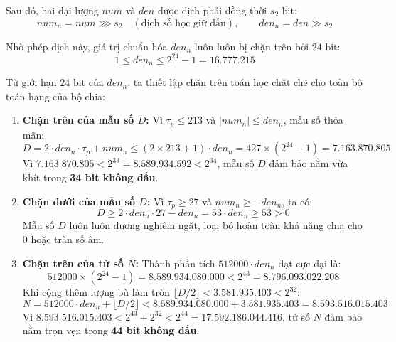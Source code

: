 Sau đó, hai đại lượng $num$ và $den$ được dịch phải đồng thời $s_2$ bit:
\begin{equation}
num_n = num \ggg s_2 \quad (\text{dịch số học giữ dấu}), \qquad den_n = den \gg s_2
\end{equation}

Nhờ phép dịch này, giá trị chuẩn hóa $den_n$ luôn luôn bị chặn trên bởi $24\text{ bit}$:
\begin{equation}
1 \le den_n \le 2^{24} - 1 = \mathbf{16.777.215}
\end{equation}

Từ giới hạn $24\text{ bit}$ của $den_n$, ta thiết lập chặn trên toán học chặt chẽ cho toàn bộ toán hạng của bộ chia:
\begin{enumerate}[leftmargin=1.5em, itemsep=2pt]
    \item \textbf{Chặn trên của mẫu số $D$:}
    Vì $\tau_p \le 213$ và $|num_n| \le den_n$, mẫu số thỏa mãn:
    \begin{equation}
    D = 2 \cdot den_n \cdot \tau_p + num_n \le (2 \times 213 + 1) \cdot den_n = 427 \times (2^{24} - 1) = \mathbf{7.163.870.805}
    \end{equation}
    Vì $7.163.870.805 < 2^{33} = 8.589.934.592 < 2^{34}$, mẫu số $D$ đảm bảo nằm vừa khít trong \textbf{34 bit không dấu}.
    \item \textbf{Chặn dưới của mẫu số $D$:}
    Vì $\tau_p \ge 27$ và $num_n \ge -den_n$, ta có:
    \begin{equation}
    D \ge 2 \cdot den_n \cdot 27 - den_n = 53 \cdot den_n \ge 53 > 0
    \end{equation}
    Mẫu số $D$ luôn luôn dương nghiêm ngặt, loại bỏ hoàn toàn khả năng chia cho 0 hoặc tràn số âm.
    \item \textbf{Chặn trên của tử số $N$:}
    Thành phần tích $512000 \cdot den_n$ đạt cực đại là:
    \begin{equation}
    512000 \times (2^{24} - 1) = \mathbf{8.589.934.080.000} < 2^{43} = 8.796.093.022.208
    \end{equation}
    Khi cộng thêm lượng bù làm tròn $\lfloor D / 2 \rfloor < 3.581.935.403 < 2^{32}$:
    \begin{equation}
    N = 512000 \cdot den_n + \lfloor D/2 \rfloor < 8.589.934.080.000 + 3.581.935.403 = \mathbf{8.593.516.015.403}
    \end{equation}
    Vì $8.593.516.015.403 < 2^{43} + 2^{32} < 2^{44} = 17.592.186.044.416$, tử số $N$ đảm bảo nằm trọn vẹn trong \textbf{44 bit không dấu}.
\end{enumerate}


